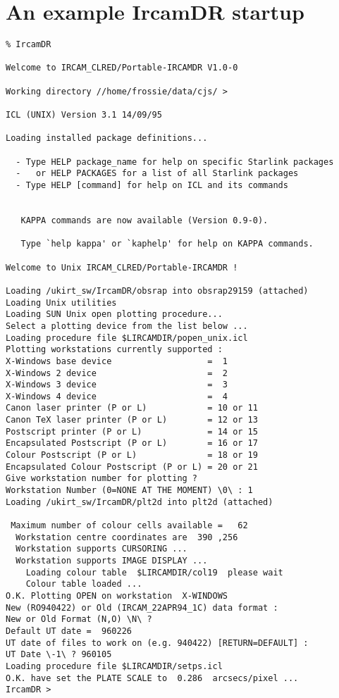 \section{An example {\sc IrcamDR} startup}

\begin{verbatim}
% IrcamDR
 
Welcome to IRCAM_CLRED/Portable-IRCAMDR V1.0-0
 
Working directory //home/frossie/data/cjs/ > 
 
ICL (UNIX) Version 3.1 14/09/95
 
Loading installed package definitions...
 
  - Type HELP package_name for help on specific Starlink packages
  -   or HELP PACKAGES for a list of all Starlink packages
  - Type HELP [command] for help on ICL and its commands
 
 
   KAPPA commands are now available (Version 0.9-0).
 
   Type `help kappa' or `kaphelp' for help on KAPPA commands.
 
Welcome to Unix IRCAM_CLRED/Portable-IRCAMDR !
 
Loading /ukirt_sw/IrcamDR/obsrap into obsrap29159 (attached)
Loading Unix utilities
Loading SUN Unix open plotting procedure...
Select a plotting device from the list below ...
Loading procedure file $LIRCAMDIR/popen_unix.icl
Plotting workstations currently supported : 
X-Windows base device                   =  1
X-Windows 2 device                      =  2
X-Windows 3 device                      =  3
X-Windows 4 device                      =  4
Canon laser printer (P or L)            = 10 or 11
Canon TeX laser printer (P or L)        = 12 or 13
Postscript printer (P or L)             = 14 or 15
Encapsulated Postscript (P or L)        = 16 or 17
Colour Postscript (P or L)              = 18 or 19
Encapsulated Colour Postscript (P or L) = 20 or 21
Give workstation number for plotting ? 
Workstation Number (0=NONE AT THE MOMENT) \0\ : 1
Loading /ukirt_sw/IrcamDR/plt2d into plt2d (attached)
  
 Maximum number of colour cells available =   62
  Workstation centre coordinates are  390 ,256
  Workstation supports CURSORING ...
  Workstation supports IMAGE DISPLAY ...
    Loading colour table  $LIRCAMDIR/col19  please wait
    Colour table loaded ...
O.K. Plotting OPEN on workstation  X-WINDOWS
New (RO940422) or Old (IRCAM_22APR94_1C) data format : 
New or Old Format (N,O) \N\ ? 
Default UT date =  960226
UT date of files to work on (e.g. 940422) [RETURN=DEFAULT] : 
UT Date \-1\ ? 960105
Loading procedure file $LIRCAMDIR/setps.icl
O.K. have set the PLATE SCALE to  0.286  arcsecs/pixel ...
IrcamDR > 
\end{verbatim}
